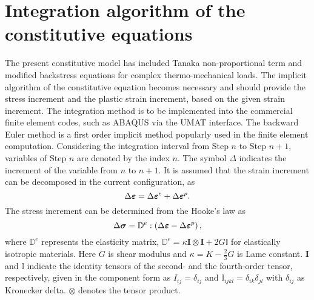 \documentclass[preprint,5p,twocolumn,11pt,sort&compress]{elsarticle}
\newcommand{\bfsigma}{{\mbox{\boldmath{$\sigma$}}}}
\newcommand{\bfepsilon}{{\mbox{\boldmath{$\varepsilon$}}}}
\begin{document}
\section{Integration algorithm of the constitutive equations}
\noindent
The present constitutive model has included Tanaka non-proportional term and modified backstress equations for complex thermo-mechanical loads. The implicit algorithm of the constitutive equation becomes necessary and should provide the stress increment and the plastic strain increment, based on the given strain increment. The integration method is to be implemented into the commercial finite element codes, such as ABAQUS via the UMAT interface.
The backward Euler method is a first order implicit method popularly used in the finite element computation. Considering the integration interval from Step $n$ to Step $n+1$, variables of Step $n$ are denoted by the index $n$. The symbol $\Delta$ indicates the increment of the variable from $n$ to $n+1$. It is assumed that the strain increment can be decomposed in the current configuration, as
\begin{equation}
{\Delta\bfepsilon} = \Delta\bfepsilon^e + \Delta\bfepsilon^p.
\end{equation}
The stress increment can be determined from the Hooke's law as
\begin{equation}
\label{Equ:sigman+1}
\Delta\bfsigma= {\mathbb{D}^e}:\left( {{\Delta\bfepsilon} - \Delta\bfepsilon^p} \right),
\end{equation}
where $\mathbb{D}^e$ represents the elasticity matrix, ${\mathbb{D}^e} = \kappa {\mathbf{I}} \otimes {\mathbf{I}} + 2G\mathbb{I}$ for elastically isotropic materials. Here $G$ is shear modulus and  $\kappa  = K - \frac{2}{3}G$  is Lame constant. ${\mathbf{I}}$ and $\mathbb{I}$ indicate the identity tensors of the second- and the fourth-order tensor, respectively, given in the component form as ${I_{ij}} = {\delta _{ij}}$ and ${\mathbb{I}_{ijkl}} = {\delta _{ik}}{\delta _{jl}}$ with ${\delta _{ij}}$ as Kronecker delta. $\otimes$ denotes the tensor product.
\end{document}
